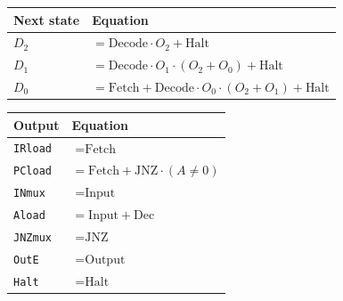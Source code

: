 \documentclass[11pt]{article}
\begin{document}
\begin{center}
\begin{tabular}{@{}ll@{}}
\toprule
\textbf{Next state} & \textbf{Equation} \\
\midrule
$D_2$ & $= \text{Decode}\cdot O_2 + \text{Halt}$ \\
$D_1$ & $= \text{Decode}\cdot O_1\cdot(O_2+O_0) + \text{Halt}$ \\
$D_0$ & $= \text{Fetch} + \text{Decode}\cdot O_0\cdot(O_2+O_1) + \text{Halt}$ \\
\bottomrule
\end{tabular}
\hspace{1cm}
\begin{tabular}{@{}ll@{}}
\toprule
\textbf{Output} & \textbf{Equation} \\
\midrule
\texttt{IRload} & $= \text{Fetch}$ \\
\texttt{PCload} & $= \text{Fetch} + \text{JNZ}\cdot(A \neq 0)$ \\
\texttt{INmux}  & $= \text{Input}$ \\
\texttt{Aload}  & $= \text{Input} + \text{Dec}$ \\
\texttt{JNZmux} & $= \text{JNZ}$ \\
\texttt{OutE}   & $= \text{Output}$ \\
\texttt{Halt}   & $= \text{Halt}$ \\
\bottomrule
\end{tabular}
\end{center}
\end{document}
